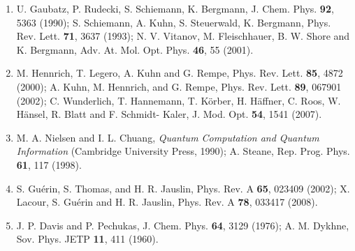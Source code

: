 {\normalsize

\begin{enumerate}
\item U. Gaubatz, P. Rudecki, S. Schiemann, K. Bergmann, J. Chem.
Phys. \textbf{92}, 5363 (1990); S. Schiemann, A. Kuhn, S.
Steuerwald, K. Bergmann, Phys. Rev. Lett. \textbf{71}, 3637 (1993);
N. V. Vitanov, M. Fleischhauer, B. W. Shore and K. Bergmann, Adv.
At. Mol. Opt. Phys. \textbf{46}, 55 (2001).

\item M. Hennrich, T. Legero, A. Kuhn and G. Rempe, Phys. Rev. Lett.
\textbf{85}, 4872 (2000); A. Kuhn, M. Hennrich, and G. Rempe, Phys.
Rev. Lett. \textbf{89}, 067901 (2002); C. Wunderlich, T. Hannemann,
T. K\"{o}rber, H. H\"{a}ffner, C. Roos, W. H\"{a}nsel, R. Blatt and
F. Schmidt- Kaler, J. Mod. Opt. \textbf{54}, 1541 (2007).

\item M. A. Nielsen and I. L. Chuang, \emph{Quantum Computation and
Quantum Information} (Cambridge University Press, 1990); A. Steane,
Rep. Prog. Phys. \textbf{61}, 117 (1998).

\item S. Gu\'{e}rin, S. Thomas, and H. R. Jauslin, Phys. Rev. A
\textbf{65}, 023409 (2002);
 X. Lacour, S. Gu\'{e}rin and H. R. Jauslin, Phys. Rev. A \textbf{78}, 033417 (2008).

\item J. P. Davis and P. Pechukas, J. Chem. Phys. \textbf{64}, 3129
(1976);
 A. M. Dykhne, Sov. Phys. JETP \textbf{11}, 411 (1960).\newline

\end{enumerate}
}

\vspace{\baselineskip}